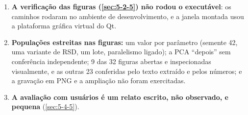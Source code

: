 \begin{enumerate}
\item \textbf{A verificação das figuras (\ref{sec:5-2-5}) não rodou o executável}: os caminhos rodaram no ambiente de desenvolvimento, e a janela montada usou a plataforma gráfica virtual do Qt.
\item \textbf{Populações estreitas nas figuras:} um valor por parâmetro (semente 42, uma variante de RSD, um lote, paralelismo ligado); a PCA ``depois'' sem conferência independente; 9 das 32 figuras abertas e inspecionadas visualmente, e as outras 23 conferidas pelo texto extraído e pelos números; e a gravação em PNG e a ampliação não foram exercitadas.
\item \textbf{A avaliação com usuários é um relato escrito, não observado, e pequena} (\ref{sec:5-4-5}).
\end{enumerate}


\endgroup
